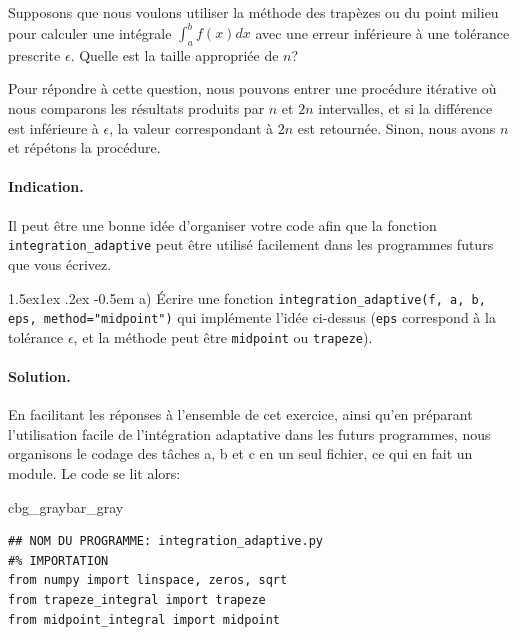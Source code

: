 \documentclass[%
oneside,                 %
final,                   %
10pt,french]{article}
\makeatletter
\newenvironment{_pro_tight}[2]{
   \def\FrameCommand{\color{#2}\vrule width 1mm\normalcolor\colorbox{#1}}
   \FrameRule0.6pt\MakeFramed {\advance\hsize-2mm\FrameRestore}\vskip3mm}
   {\vskip0mm\endMakeFramed}
\newenvironment{pro}[2]{
\bgroup\rmfamily
\fboxsep=0mm\relax
\begin{_pro_tight}{#1}{#2}
\list{}{\parsep=-2mm\parskip=0mm\topsep=0pt\leftmargin=2mm
\rightmargin=2\leftmargin\leftmargin=4pt\relax}
\item\relax}
{\endlist\end{_pro_tight}\egroup}
\newenvironment{doconceexercise}{}{}
\newcounter{doconceexercisecounter}
\newcommand\subex{\@startsection{paragraph}{4}{\z@}%
                  {1.5ex\@plus1ex \@minus.2ex}%
                  {-0.5em}%
                  {\normalfont\normalsize\bfseries}}
\makeatother
\begin{document}


\begin{doconceexercise}


\label{ex:adaptatif}

Supposons que nous voulons utiliser la méthode des trapèzes ou du point milieu pour calculer une intégrale $\int_a^b f(x)dx$ avec une erreur inférieure à une tolérance prescrite $\epsilon$. Quelle est la taille appropriée de $n$?

Pour répondre à cette question, nous pouvons entrer une procédure itérative où nous comparons les résultats produits par $n$ et $2n$ intervalles, et si la différence est inférieure à $\epsilon$, la valeur correspondant à $2n$ est retournée. Sinon, nous avons $n$ et répétons la procédure.


\paragraph{Indication.}
Il peut être une bonne idée d'organiser votre code afin que la fonction \Verb!integration_adaptive! peut être utilisé facilement dans les programmes futurs que vous écrivez.



\subex{a)}
Écrire une fonction \Verb!integration_adaptive(f, a, b, eps, method="midpoint")! qui implémente l'idée ci-dessus (\texttt{eps} correspond à la tolérance $\epsilon$, et la méthode peut être \texttt{midpoint} ou \texttt{trapeze}).


\paragraph{Solution.}
En facilitant les réponses à l'ensemble de cet exercice, ainsi qu'en préparant l'utilisation facile de l'intégration adaptative dans les futurs programmes, nous organisons le codage des tâches a, b et c en un seul fichier, ce qui en fait un module. Le code se lit alors:

\begin{pro}{cbg_gray}{bar_gray}\begin{verbatim}
## NOM DU PROGRAMME: integration_adaptive.py
#% IMPORTATION
from numpy import linspace, zeros, sqrt
from trapeze_integral import trapeze
from midpoint_integral import midpoint


\end{verbatim}
\end{pro}
\end{doconceexercise}
\end{document}
